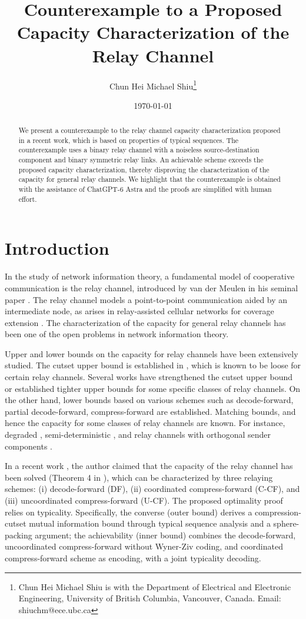 \documentclass[12pt]{article}
\title{Counterexample to a Proposed Capacity Characterization of the Relay Channel}
\author{Chun Hei Michael Shiu\thanks{Chun Hei Michael Shiu is with the Department of Electrical and Electronic Engineering, University of British Columbia, Vancouver, Canada. Email: {shiuchm@ece.ubc.ca}}}
\date{\today}
\theoremstyle{definition}
\begin{document}
\maketitle

\begin{abstract}
    We present a counterexample to the relay channel capacity characterization proposed in a recent work, which is based on properties of typical sequences. The counterexample uses a binary relay channel with a noiseless source-destination component and binary symmetric relay links. An achievable scheme exceeds the proposed capacity characterization, thereby disproving the characterization of the capacity for general relay channels. We highlight that the counterexample is obtained with the assistance of ChatGPT-6 Astra and the proofs are simplified with human effort.
\end{abstract}


\section{Introduction}

In the study of network information theory, a fundamental model of cooperative communication is the relay channel, introduced by van der Meulen in his seminal paper \cite{van71}. The relay channel models a point-to-point communication aided by an intermediate node, as arises in relay-assisted cellular networks for coverage extension \cite{kad10}. The characterization of the capacity for general relay channels has been one of the open problems in network information theory.

Upper and lower bounds on the capacity for relay channels have been extensively studied. The cutset upper bound is established in \cite{cov79}, which is known to be loose for certain relay channels. Several works have strengthened the cutset upper bound \cite{wu17improve, el22} or established tighter upper bounds \cite{wu17} for some specific classes of relay channels. On the other hand, lower bounds based on various schemes such as decode-forward, partial decode-forward, compress-forward are established. Matching bounds, and hence the capacity for some classes of relay channels are known. For instance, degraded \cite{cov79}, semi-deterministic \cite{gam82}, and relay channels with orthogonal sender components \cite{el05}.

In a recent work \cite{pon26}, the author claimed that the capacity of the relay channel has been solved (Theorem 4 in \cite{pon26}), which can be characterized by three relaying schemes: (i) decode-forward (DF), (ii) coordinated compress-forward (C-CF), and (iii) uncoordinated compress-forward (U-CF). The proposed optimality proof relies on typicality. Specifically, the converse (outer bound) derives a compression-cutset mutual information bound through typical sequence analysis and a sphere-packing argument; the achievability (inner bound) combines the decode-forward, uncoordinated compress-forward without Wyner-Ziv coding, and coordinated compress-forward scheme as encoding, with a joint typicality decoding.
\end{document}
